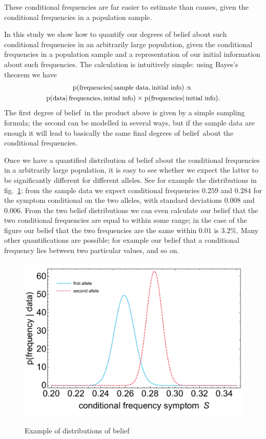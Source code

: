 \documentclass[\ifafour a4paper,12pt,\else a5paper,10pt,\fi%
onecolumn,oneside,article,%
british%
]{memoir}
\theoremstyle{remark}
\theoremstyle{innote}
\newcommand*{\pf}{\mathrm{p}}%
\renewcommand*{\|}{\mathpunct{|}}
\newcommand*{\fig}{fig.}%
\newcommand*{\ptext}[1]{\text{\small #1}}
\newcommand*{\dob}{degree of belief}
\newcommand*{\dobs}{degrees of belief}
\begin{document}
These conditional frequencies are far easier to estimate than causes, given
the conditional frequencies in a population sample.


In this study we show how to quantify our degrees of belief about such
conditional frequencies in an arbitrarily large population, given the
conditional frequencies in a population sample and a representation of our
initial information about such frequencies. The calculation is intuitively
simple: using Bayes's theorem we have
\begin{multline}
  \label{eq:intuitive_Bayes}
  \pf(\ptext{frequencies} \| \ptext{sample data}, \ptext{initial info})
  \propto{}\\
  \pf(\ptext{data} \| \ptext{frequencies}, \ptext{initial info})
  \times
  \pf(\ptext{frequencies} \| \ptext{initial info}).
\end{multline}
The first \dob\ in the product above is given by a simple sampling formula;
the second can be modelled in several ways, but if the sample data are
enough it will lead to basically the same final \dobs\ about the
conditional frequencies.

Once we have a quantified distribution of belief about the conditional
frequencies in a arbitrarily large population, it is easy to see whether we
expect the latter to be significantly different for different alleles. See
for example the distributions in \fig~\ref{fig:example_distributions}: from
the sample data we expect conditional frequencies $0.259$ and $0.284$ for
the symptom conditional on the two alleles, with standard deviations
$0.008$ and $0.006$. From the two belief distributions we can even
calculate our belief that the two conditional frequencies are equal to
within some range; in the case of the figure our belief that the two
frequencies are the same within $0.01$ is $3.2\%$. Many other
quantifications are possible; for example our belief that a conditional
frequency lies between two particular values, and so on.
\begin{figure}[b!]%
 \centering\includegraphics[width=0.75\linewidth]{example_distr_condfreqs.pdf}\\
\caption{Example of distributions of belief}\label{fig:example_distributions}
\end{figure}%
\end{document}
